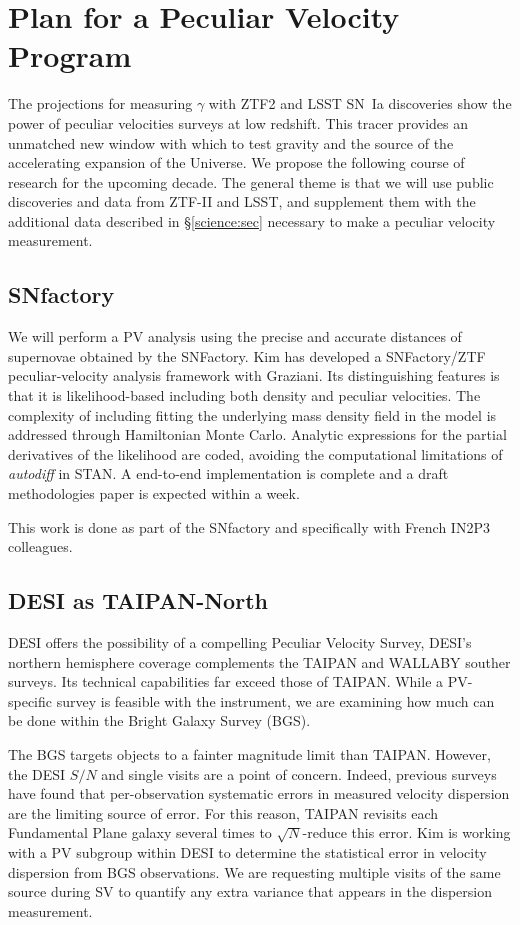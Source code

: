 \section{Plan for a Peculiar Velocity Program}
The projections for measuring $\gamma$ with ZTF2 and LSST SN~Ia discoveries
show the power of peculiar velocities surveys at low redshift.
This  tracer provides an unmatched  new window with which to test gravity and the source of the accelerating expansion of the Universe.
We propose the following course of research for the upcoming decade.  The general theme is that we will use public discoveries and data
from ZTF-II and LSST, and supplement them with the additional data  described
in \S\ref{science:sec} necessary to make a  peculiar velocity measurement.

\subsection{SNfactory}
We will perform a PV analysis using the precise and accurate distances of supernovae obtained by the SNFactory.
Kim has developed a SNFactory/ZTF peculiar-velocity analysis framework with Graziani.  Its distinguishing features is that it is likelihood-based
including both density and peculiar velocities.  The complexity of including fitting the underlying mass density field in the model
is addressed through Hamiltonian Monte Carlo.  Analytic expressions for the partial derivatives of the likelihood are coded,
avoiding the computational limitations of {\it autodiff} in STAN.  A end-to-end implementation is complete
and a draft methodologies paper is expected within a week.


This work is done as part of the SNfactory and specifically with French IN2P3 colleagues.

\subsection{DESI as TAIPAN-North}

DESI offers the possibility of a compelling Peculiar Velocity Survey,  DESI's northern hemisphere coverage complements 
the TAIPAN and WALLABY souther surveys.   Its technical capabilities far exceed those of TAIPAN.  While a PV-specific
survey is feasible with the instrument, we are examining how much can be done within the Bright Galaxy Survey (BGS).

The BGS targets objects to a fainter magnitude limit than TAIPAN.  However, the DESI $S/N$ and single visits are a point of concern.
Indeed, previous surveys have found that per-observation systematic errors in measured velocity dispersion are the limiting
source of error.  For this reason, TAIPAN revisits each Fundamental Plane galaxy several times to $\sqrt{N}$-reduce this error.
Kim is working with a PV subgroup within DESI to determine the statistical error in velocity dispersion from BGS observations.
We are requesting multiple visits of the same source during SV to quantify any extra variance that appears in
the dispersion measurement.

